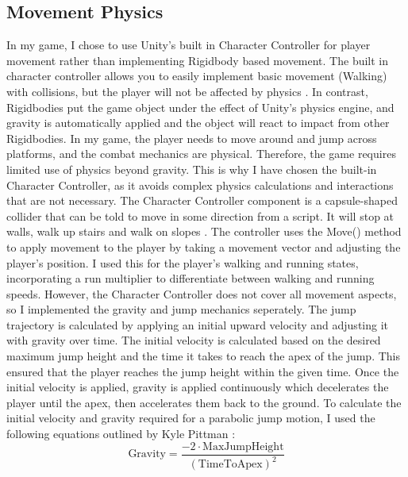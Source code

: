 \documentclass[]{final_report}
\begin{document}
\subsection{Movement Physics}
In my game, I chose to use Unity's built in Character Controller for player movement rather than implementing Rigidbody based movement. The built in character controller allows you to easily implement basic movement (Walking) with collisions, but the player will not be affected by physics \cite{unity2024_charactercontroller}. In contrast, Rigidbodies put the game object under the effect of Unity's physics engine, and gravity is automatically applied and the object will react to impact from other Rigidbodies. In my game, the player needs to move around and jump across platforms, and the combat mechanics are physical. Therefore, the game requires limited use of physics beyond gravity.  This is why I have chosen the built-in Character Controller, as it avoids complex physics calculations and interactions that are not necessary. \newline
The Character Controller component is a capsule-shaped collider that can be told to move in some direction from a script. It will stop at walls, walk up stairs and walk on slopes \cite{unity2024_charactercontroller_reference}. The controller uses the Move() method to apply movement to the player by taking a movement vector and adjusting the player's position. I used this for the player's walking and running states, incorporating a run multiplier to differentiate between walking and running speeds. However, the Character Controller does not cover all movement aspects, so I implemented the gravity and jump mechanics seperately.  \newline
The jump trajectory is calculated by applying an initial upward velocity and adjusting it with gravity over time. The initial velocity is calculated based on the desired maximum jump height and the time it takes to reach the apex of the jump. This ensured that the player reaches the jump height within the given time. Once the initial velocity is applied, gravity is applied continuously which decelerates the player until the apex, then accelerates them back to the ground. To calculate the initial velocity and gravity required for a parabolic jump motion, I used the following equations outlined by Kyle Pittman \cite{pittman2016_jump}:
\begin{equation}
\text{Gravity} = \frac{-2 \cdot \text{MaxJumpHeight}}{(\text{TimeToApex})^2}
\end{equation}
\end{document}
